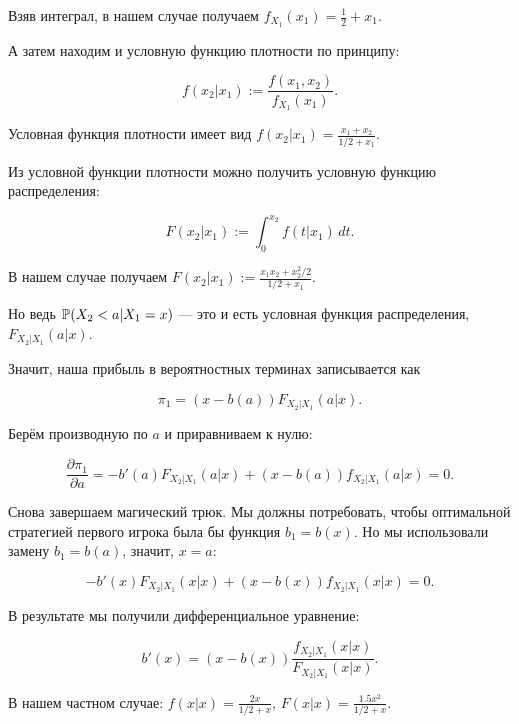 \begin{enumerate}
Взяв интеграл, в нашем случае получаем $f_{X_{1}}(x_{1})=\frac{1}{2}+x_{1}$.

А затем находим и условную функцию плотности по принципу:

\begin{equation}
f(x_{2}|x_{1}):=\frac{f(x_{1},x_{2})}{f_{X_{1}}(x_{1})}.
\end{equation}

Условная функция плотности имеет вид $ f(x_{2}|x_{1})=\frac{x_{1}+x_{2}}{1/2+x_{1}} $.

Из условной функции плотности можно получить условную функцию распределения:

\begin{equation}
F(x_{2}|x_{1}):=\int_{0}^{x_{2}} f(t|x_{1}) \, dt.
\end{equation}

В нашем случае получаем $F(x_{2}|x_{1}):=\frac{x_{1}x_{2}+x_{2}^{2}/2}{1/2+x_{1}}$.

Но ведь $ \P(X_{2}<a|X_{1}=x) $ — это и есть условная функция распределения, $ F_{X_{2}|X_{1}}(a|x) $.

Значит, наша прибыль в вероятностных терминах записывается как

\begin{equation}
\pi_{1}=(x-b(a)) F_{X_{2}|X_{1}}(a|x).
\end{equation}

Берём производную по $ a $ и приравниваем к нулю:

\begin{equation}
\frac{\partial \pi_{1}}{\partial a}=-b'(a) F_{X_{2}|X_{1}}(a|x)+(x-b(a))f_{X_{2}|X_{1}}(a|x)=0.
\end{equation}

Снова завершаем магический трюк. Мы должны потребовать, чтобы оптимальной стратегией первого игрока была бы функция $b_{1}=b(x)$. Но мы использовали замену $ b_{1}=b(a) $, значит, $ x=a $:


\begin{equation}
-b'(x) F_{X_{2}|X_{1}}(x|x)+(x-b(x))f_{X_{2}|X_{1}}(x|x)=0.
\end{equation}

В результате мы получили дифференциальное уравнение:

\begin{equation}
b'(x)=(x-b(x))\frac{f_{X_{2}|X_{1}}(x|x)}{F_{X_{2}|X_{1}}(x|x)}.
\end{equation}

В нашем частном случае: $ f(x|x)=\frac{2x}{1/2+x} $, $ F(x|x)=\frac{1.5x^2}{1/2+x} $.


\end{enumerate}
